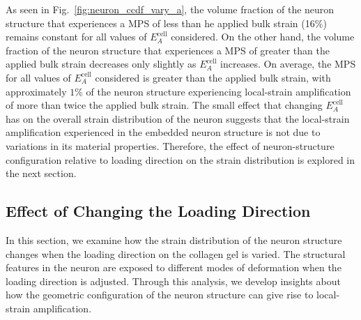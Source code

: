 \documentclass[]{interact}
\begin{document}
As seen in Fig.\ \ref{fig:neuron_ccdf_vary_a}, the volume fraction of the neuron structure that experiences a MPS of less than he applied bulk strain (16$\%$) remains constant for all values of $E_A^{\text{cell}}$ considered. On the other hand, the volume fraction of the neuron structure that experiences a MPS of greater than the applied bulk strain decreases only slightly as $E_A^{\text{cell}}$ increases. On average, the MPS for all values of $E_A^{\text{cell}}$ considered is greater than the applied bulk strain, with approximately $1\%$ of the neuron structure experiencing local-strain amplification of more than twice the applied bulk strain. The small effect that changing $E_A^{\text{cell}}$ has on the overall strain distribution of the neuron suggests that the local-strain amplification experienced in the embedded neuron structure is not due to variations in its material properties. Therefore, the effect of neuron-structure configuration  relative to loading direction on the strain distribution is explored in the next section.

\subsection{Effect of Changing the Loading Direction}
\label{sec:loading_direction}
In this section, we examine how the strain distribution of the neuron structure changes when the loading direction on the collagen gel is varied. The structural features in the neuron are exposed to different modes of deformation when the loading direction is adjusted. Through this analysis, we develop insights about how the geometric configuration of the neuron structure can give rise to local-strain amplification.
\end{document}
